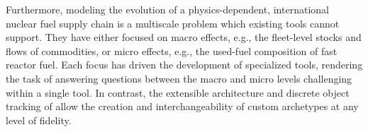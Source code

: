 Furthermore, modeling the evolution of a physics-dependent, international nuclear fuel supply
chain is a multiscale problem which existing tools cannot support. They have either focused on macro effects, e.g., the fleet-level
stocks and flows of commodities, or micro effects, e.g., the used-fuel
composition of fast reactor fuel. Each focus has driven the
development of specialized tools, rendering the task of answering questions between
the macro and micro levels challenging within a single tool.
In contrast, the extensible architecture and discrete object tracking of \Cyclus allow
the creation and interchangeability of custom archetypes at any level of fidelity.
